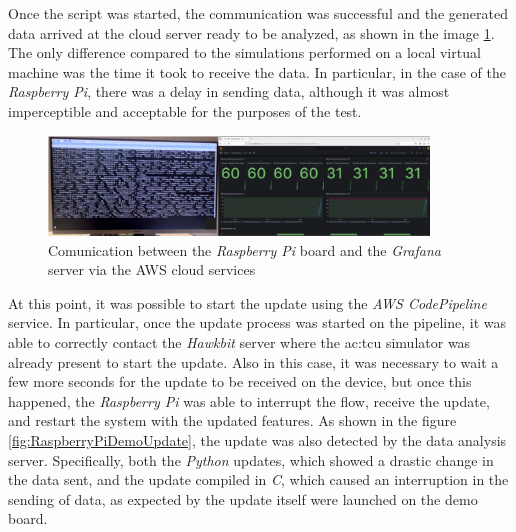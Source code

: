 Once the script was started, the communication was successful and the generated data arrived at the cloud server ready to be analyzed, as shown in the image \ref{fig:RaspberryPiDemo}. The only difference compared to the simulations performed on a local virtual machine was the time it took to receive the data. In particular, in the case of the \textit{Raspberry Pi}, there was a delay in sending data, although it was almost imperceptible and acceptable for the purposes of the test.
\begin{figure}[h]  %
    \centering
    \includegraphics[width=0.9\textwidth]{images/RaspberryPiDemo.png}  %
    \caption{Comunication between the \textit{Raspberry Pi} board and the \textit{Grafana} server via the AWS cloud services}
    \label{fig:RaspberryPiDemo}
\end{figure}

At this point, it was possible to start the update using the \textit{AWS CodePipeline} service. In particular, once the update process was started on the pipeline, it was able to correctly contact the \textit{Hawkbit} server where the \gls{ac:tcu} simulator was already present to start the update. 
Also in this case, it was necessary to wait a few more seconds for the update to be received on the device, but once this happened, the \textit{Raspberry Pi} was able to interrupt the flow, receive the update, and restart the system with the updated features. 
As shown in the figure \ref{fig:RaspberryPiDemoUpdate}, the update was also detected by the data analysis server. Specifically, both the \textit{Python} updates, which showed a drastic change in the data sent, and the update compiled in \textit{C}, which caused an interruption in the sending of data, as expected by the update itself were launched on the demo board.

